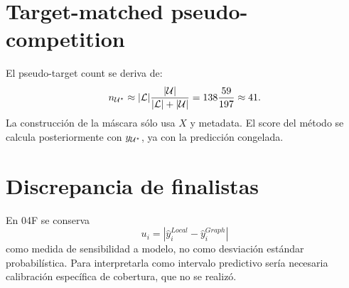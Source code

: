 \section{Target-matched pseudo-competition}

El pseudo-target count se deriva de:
\[
n_{\mathcal{U}^\star}
\approx
|\mathcal{L}|\frac{|\mathcal{U}|}{|\mathcal{L}|+|\mathcal{U}|}
=
138\frac{59}{197}
\approx41.
\]
La construcción de la máscara sólo usa $X$ y metadata. El score del método se calcula
posteriormente con $y_{\mathcal{U}^\star}$, ya con la predicción congelada.

\section{Discrepancia de finalistas}

En 04F se conserva
\[
u_i=
|\hat y_i^{Local}-\hat y_i^{Graph}|
\]
como medida de sensibilidad a modelo, no como desviación estándar probabilística. Para
interpretarla como intervalo predictivo sería necesaria calibración específica de cobertura,
que no se realizó.
